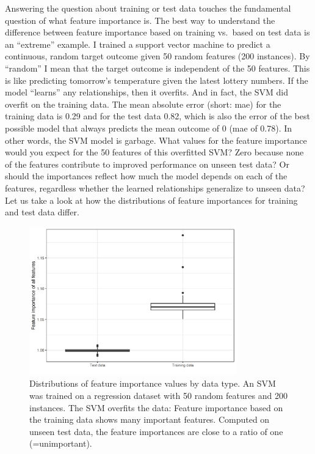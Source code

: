 \documentclass[
  10pt,
]{scrbook}
\begin{document}
Answering the question about training or test data touches the fundamental question of what feature importance is.
The best way to understand the difference between feature importance based on training vs.~based on test data is an ``extreme'' example.
I trained a support vector machine to predict a continuous, random target outcome given 50 random features (200 instances).
By ``random'' I mean that the target outcome is independent of the 50 features.
This is like predicting tomorrow's temperature given the latest lottery numbers.
If the model ``learns'' any relationships, then it overfits.
And in fact, the SVM did overfit on the training data.
The mean absolute error (short: mae) for the training data is 0.29 and for the test data 0.82, which is also the error of the best possible model that always predicts the mean outcome of 0 (mae of 0.78).
In other words, the SVM model is garbage.
What values for the feature importance would you expect for the 50 features of this overfitted SVM?
Zero because none of the features contribute to improved performance on unseen test data?
Or should the importances reflect how much the model depends on each of the features, regardless whether the learned relationships generalize to unseen data?
Let us take a look at how the distributions of feature importances for training and test data differ.

\begin{figure}

{\centering \includegraphics[width=0.8\textwidth]{images/feature-imp-sim-1} 

}

\caption{Distributions of feature importance values by data type. An SVM was trained on a regression dataset with 50 random features and 200 instances. The SVM overfits the data: Feature importance based on the training data shows many important features. Computed on unseen test data, the feature importances are close to a ratio of one (=unimportant).}\label{fig:feature-imp-sim}
\end{figure}
\end{document}
